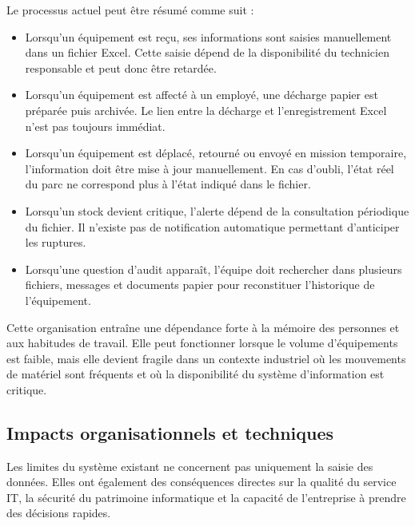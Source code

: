 Le processus actuel peut être résumé comme suit :

\begin{itemize}[label=\textbullet,font=\normalsize]
    \item Lorsqu'un équipement est reçu, ses informations sont saisies manuellement dans un fichier Excel. Cette saisie dépend de la disponibilité du technicien responsable et peut donc être retardée.
    \item Lorsqu'un équipement est affecté à un employé, une décharge papier est préparée puis archivée. Le lien entre la décharge et l'enregistrement Excel n'est pas toujours immédiat.
    \item Lorsqu'un équipement est déplacé, retourné ou envoyé en mission temporaire, l'information doit être mise à jour manuellement. En cas d'oubli, l'état réel du parc ne correspond plus à l'état indiqué dans le fichier.
    \item Lorsqu'un stock devient critique, l'alerte dépend de la consultation périodique du fichier. Il n'existe pas de notification automatique permettant d'anticiper les ruptures.
    \item Lorsqu'une question d'audit apparaît, l'équipe doit rechercher dans plusieurs fichiers, messages et documents papier pour reconstituer l'historique de l'équipement.
\end{itemize}

Cette organisation entraîne une dépendance forte à la mémoire des personnes et aux habitudes de travail. Elle peut fonctionner lorsque le volume d'équipements est faible, mais elle devient fragile dans un contexte industriel où les mouvements de matériel sont fréquents et où la disponibilité du système d'information est critique.

\subsection{Impacts organisationnels et techniques}

Les limites du système existant ne concernent pas uniquement la saisie des données. Elles ont également des conséquences directes sur la qualité du service IT, la sécurité du patrimoine informatique et la capacité de l'entreprise à prendre des décisions rapides.

